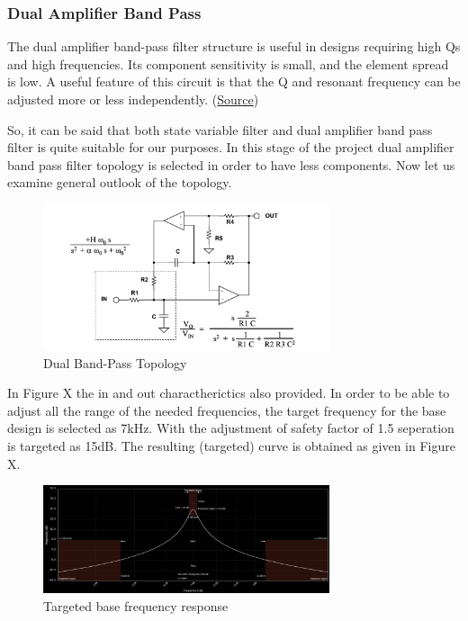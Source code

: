 \documentclass[letterpaper,12pt]{article}
\begin{document}
\subsubsection{Dual Amplifier Band Pass}

The dual amplifier band-pass filter structure is useful in designs requiring high Qs and high frequencies. Its component sensitivity is small, and the element spread is low. A useful feature of this circuit is that the Q and resonant frequency can be adjusted more or less independently. (\href{https://www.analog.com/media/en/training-seminars/tutorials/MT-209.pdf}{Source})

\vspace{2mm}
So, it can be said that both state variable filter and dual amplifier band pass filter is quite suitable for our purposes. In this stage of the project dual amplifier band pass filter topology is selected in order to have less components. Now let us examine general outlook of the topology.
\begin{figure}[H]
    \centering
    \includegraphics[width = 0.75\textwidth]{dualbandpass.png}
    \caption{Dual Band-Pass Topology}
\end{figure} 
In Figure X the in and out charactherictics also provided. In order to be able to adjust all the range of the needed frequencies, the target frequency for the base design is selected as 7kHz. With the adjustment of safety factor of 1.5 seperation is targeted as 15dB. The resulting (targeted) curve is obtained as given in Figure X.
\begin{figure}[H]
    \centering
    \includegraphics[width = 0.75\textwidth]{response.png}
    \caption{Targeted base frequency response}
\end{figure} 
\end{document}
